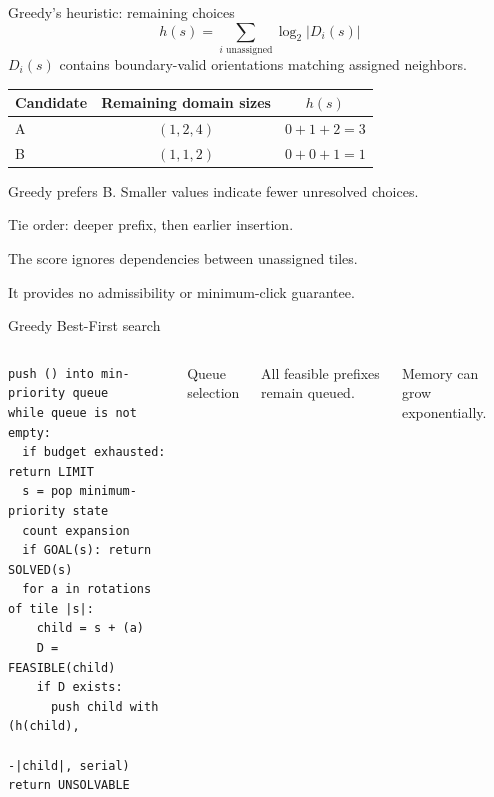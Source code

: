 \begin{frame}{Greedy's heuristic: remaining choices}
\[
h(s)=\sum_{i\text{ unassigned}}\log_2 |D_i(s)|
\]
\small $D_i(s)$ contains boundary-valid orientations matching assigned neighbors.
\vspace{5mm}
\begin{center}
\begin{tabular}{@{}lcc@{}}
\toprule
Candidate & Remaining domain sizes & $h(s)$\\\midrule
A & $(1,2,4)$ & $0+1+2=3$\\
B & $(1,1,2)$ & $0+0+1=1$\\\bottomrule
\end{tabular}
\end{center}
\vspace{3mm}
Greedy prefers B. Smaller values indicate fewer unresolved choices.\par
\small Tie order: deeper prefix, then earlier insertion.\par\vspace{3mm}
The score ignores dependencies between unassigned tiles.\par
It provides no admissibility or minimum-click guarantee.
\end{frame}

\begin{frame}[fragile]{Greedy Best-First search}
\begin{columns}[T,onlytextwidth]
\begin{lstlisting}
push () into min-priority queue
while queue is not empty:
  if budget exhausted: return LIMIT
  s = pop minimum-priority state
  count expansion
  if GOAL(s): return SOLVED(s)
  for a in rotations of tile |s|:
    child = s + (a)
    D = FEASIBLE(child)
    if D exists:
      push child with (h(child),
                       -|child|, serial)
return UNSOLVABLE
\end{lstlisting}
\small Queue selection\par\vspace{3mm}
\par\vspace{3mm}
All feasible prefixes remain queued.\par\vspace{3mm}
Memory can grow exponentially.
\end{columns}
\end{frame}

